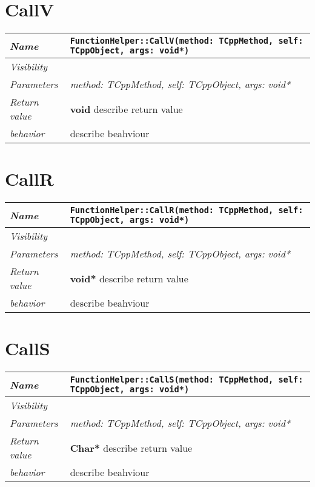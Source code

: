  \section{CallV}
\begin{longtable}{p{3cm} @{\hskip 1cm} p{12cm}}
 \hline
\textit{Name} & \texttt{FunctionHelper::CallV(method: TCppMethod, self: TCppObject, args: void*)}\\
\hline
 \textit{Visibility} & \\
\hline
\textit{Parameters} & \textit{method: TCppMethod, self: TCppObject, args: void*}\\
\hline
\textit{Return value} & \textbf{ void} describe return value\\
  \hline
 \textit{behavior} & describe beahviour \\
\hline
\end{longtable} \pagebreak
 \section{CallR}
\begin{longtable}{p{3cm} @{\hskip 1cm} p{12cm}}
 \hline
\textit{Name} & \texttt{FunctionHelper::CallR(method: TCppMethod, self: TCppObject, args: void*)}\\
\hline
 \textit{Visibility} & \\
\hline
\textit{Parameters} & \textit{method: TCppMethod, self: TCppObject, args: void*}\\
\hline
\textit{Return value} & \textbf{ void*} describe return value\\
  \hline
 \textit{behavior} & describe beahviour \\
\hline
\end{longtable} \pagebreak
 \section{CallS}
\begin{longtable}{p{3cm} @{\hskip 1cm} p{12cm}}
 \hline
\textit{Name} & \texttt{FunctionHelper::CallS(method: TCppMethod, self: TCppObject, args: void*)}\\
\hline
 \textit{Visibility} & \\
\hline
\textit{Parameters} & \textit{method: TCppMethod, self: TCppObject, args: void*}\\
\hline
\textit{Return value} & \textbf{ Char*} describe return value\\
  \hline
 \textit{behavior} & describe beahviour \\
\hline
\end{longtable} \pagebreak
